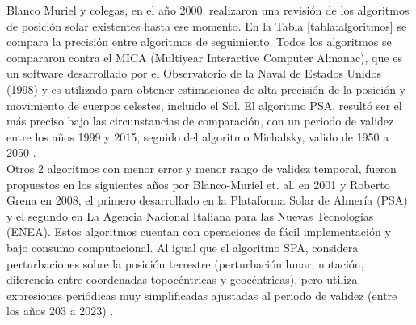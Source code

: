 %

\newpage
Blanco Muriel y colegas, en el año 2000, realizaron una revisión de los algoritmos de posición solar existentes hasta ese momento. En la Tabla \ref{tabla:algoritmos} se compara la precisión entre algoritmos de seguimiento. Todos los algoritmos se compararon contra el MICA (Multiyear Interactive Computer Almanac), que es un software desarrollado por el Observatorio de la Naval de Estados Unidos (1998) y es utilizado para obtener estimaciones de alta precisión de la posición y movimiento de cuerpos celestes, incluido el Sol. El algoritmo PSA, resultó ser el más preciso bajo las circunstancias de comparación, con un periodo de validez entre los años 1999 y 2015, seguido del algoritmo Michalsky, valido de 1950 a 2050 \cite{DDC2}.\\


Otros 2 algoritmos con menor error y menor rango de validez temporal, fueron propuestos en los siguientes años por Blanco-Muriel et. al. en 2001 y Roberto Grena en 2008, el primero desarrollado en la Plataforma Solar de Almería (PSA) y el segundo en La Agencia Nacional Italiana para las Nuevas Tecnologías (ENEA). Estos algoritmos cuentan con operaciones de fácil implementación y bajo consumo computacional. Al igual que el algoritmo SPA, considera perturbaciones sobre la posición terrestre (perturbación lunar, nutación, diferencia entre coordenadas topocéntricas y geocéntricas), pero utiliza expresiones periódicas muy simplificadas ajustadas al periodo de validez (entre los años 203 a 2023) \cite{DDC3}. 

